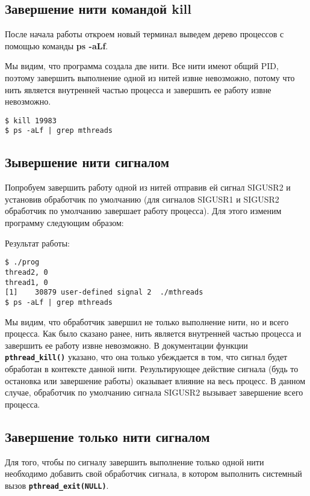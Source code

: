 \documentclass[a4paper]{article}
\begin{document}
	\subsection{Завершение нити командой kill}	
	После начала работы откроем новый терминал выведем дерево процессов с помощью команды \textbf{ps -aLf}.
	
	
	Мы видим, что программа создала две нити. Все нити имеют общий PID, поэтому завершить выполнение одной из нитей извне невозможно, потому что нить является внутренней частью процесса и завершить ее работу извне невозможно.
	\begin{lstlisting}[style=crs_bash]		
$ kill 19983
$ ps -aLf | grep mthreads
 	\end{lstlisting}
 	
	\subsection{Зывершение нити сигналом}	
	Попробуем завершить работу одной из нитей отправив ей сигнал SIGUSR2 и установив обработчик по умолчанию (для сигналов SIGUSR1 и SIGUSR2 обработчик по умолчанию завершает работу процесса). Для этого изменим программу следующим образом:
	
	
	Результат работы:
	\begin{lstlisting}[style=crs_bash]		
$ ./prog
thread2, 0
thread1, 0
[1]    30879 user-defined signal 2  ./mthreads
$ ps -aLf | grep mthreads
 	\end{lstlisting}
 	
 	Мы видим, что обработчик завершил не только выполнение нити, но и всего процесса. Как было сказано ранее, нить является внутренней частью процесса и завершить ее работу извне невозможно. В документации функции \textbf{\texttt{pthread\_kill()}} указано, что она только убеждается в том, что сигнал будет обработан в контексте данной нити. Результирующее действие сигнала (будь то остановка или завершение работы) оказывает влияние на весь процесс. В данном случае, обработчик по умолчанию сигнала SIGUSR2 вызывает завершение всего процесса.
 	
	\subsection{Завершение только нити сигналом}
 	Для того, чтобы по сигналу завершить выполнение только одной нити необходимо добавить свой обработчик сигнала, в котором выполнить системный вызов \textbf{\texttt{pthread\_exit(NULL)}}.
	
	
\end{document}
